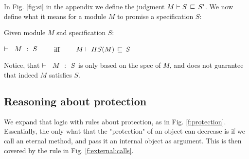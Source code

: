 In   Fig.  \ref{fig:si} in the appendix we define the judgment  $M \vdash S\, \sqsubseteq\, S' $.
We now define what it means for a module $M$ to promise a specification $S$:

\begin{definition}
Given module $M$ snd specification $S$:

\strut \hspace{2cm} ${\vdash \ \ M\ \ \mathbf{:}\ \ S}$ \ \ \ \  iff \ \ \ \  $M \vdash HS(M)\, \sqsubseteq\, S$
\end{definition}

Notice, that ${\vdash \ \ M\ \ \mathbf{:}\ \ S}$ is only based on the spec of $M$, and does not guarantee that indeed $M$ satisfies $S$.


% 
%
%
%
 


\subsection{Reasoning about protection}
We expand that logic with rules about protection, as in Fig. \ref{f:protection}. Essentially, the only what that the "protection" of an object can decrease is if we call an eternal method, and pass it an internal object as argument. This is then covered by the rule in Fig. \ref{f:external:calls}.


